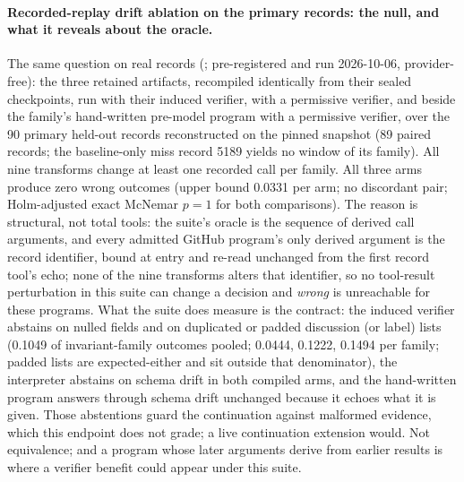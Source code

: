 \paragraph{Recorded-replay drift ablation on the primary records: the null,
and what it reveals about the oracle.}
The same question on real records
(; pre-registered
and run 2026-10-06, provider-free): the three retained artifacts, recompiled
identically from their sealed checkpoints, run with their induced verifier,
with a permissive verifier, and beside the family's hand-written pre-model
program with a permissive verifier, over the 90 primary held-out records
reconstructed on the pinned snapshot (89 paired records; the baseline-only
miss record 5189 yields no window of its family). All nine transforms change
at least one recorded call per family. All three arms produce zero wrong
outcomes (upper bound 0.0331 per arm; no discordant pair; Holm-adjusted
exact McNemar $p=1$ for both comparisons). The reason is structural, not
total tools: the suite's oracle is the sequence of derived call arguments,
and every admitted GitHub program's only derived argument is the record
identifier, bound at entry and re-read unchanged from the first record tool's
echo; none of the nine transforms alters that identifier, so no tool-result
perturbation in this suite can change a decision and \emph{wrong} is
unreachable for these programs. What the
suite does measure is the contract: the induced verifier abstains on nulled
fields and on duplicated or padded discussion (or label) lists (0.1049 of
invariant-family outcomes pooled; 0.0444, 0.1222, 0.1494 per family; padded
lists are expected-either and sit outside that denominator), the interpreter abstains
on schema drift in both compiled arms, and the hand-written program answers
through schema drift unchanged because it echoes what it is given. Those
abstentions guard the continuation against malformed evidence, which this
endpoint does not grade; a live continuation extension would. Not
equivalence; and a program whose later arguments derive from earlier results
is where a verifier benefit could appear under this suite.

